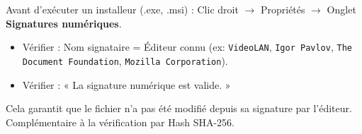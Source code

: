\documentclass[11pt]{article}
\begin{document}
\begin{propriete}
    Avant d'exécuter un installeur (.exe, .msi) : Clic droit $\rightarrow$ Propriétés $\rightarrow$ Onglet \textbf{Signatures numériques}.
    \begin{itemize}
        \item Vérifier : Nom signataire = Éditeur connu (ex: \texttt{VideoLAN}, \texttt{Igor Pavlov}, \texttt{The Document Foundation}, \texttt{Mozilla Corporation}).
        \item Vérifier : « La signature numérique est valide. »
    \end{itemize}
    Cela garantit que le fichier n'a pas été modifié depuis sa signature par l'éditeur. Complémentaire à la vérification par Hash SHA-256.
\end{propriete}
\end{document}
